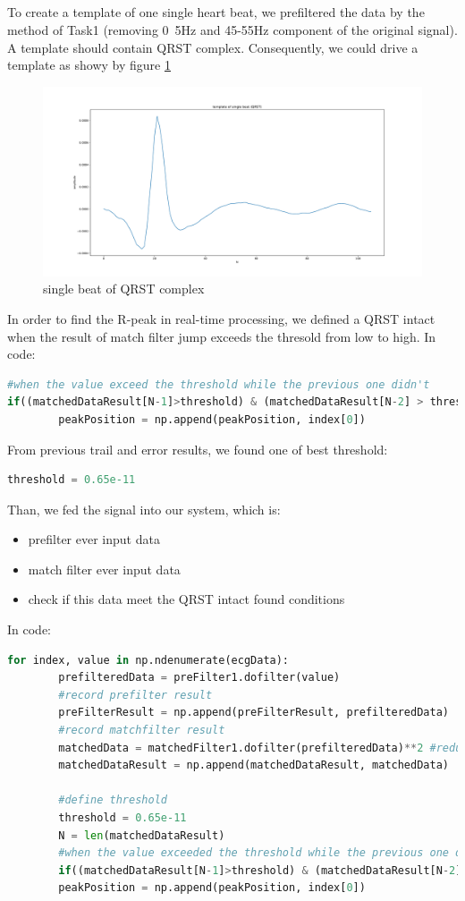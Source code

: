 \documentclass[a4paper,12pt]{article}
\begin{document}
\subsection{}
To create a template of one single heart beat, we prefiltered the data by the method of Task1 (removing 0~5Hz and 45-55Hz component of the original signal). A template should contain QRST complex. Consequently, we could drive a template as showy by figure \ref{fig_matchCore}
\begin{figure}[H]   
	\centering 
	\includegraphics[width=12cm]{../Figures/matchCore.pdf} 
	\caption{single beat of QRST complex}   
	\label{fig_matchCore}
\end{figure}
In order to find the R-peak in real-time processing, we defined a QRST intact when the result of match filter jump exceeds the thresold from low to high.  In code:
\begin{lstlisting}[language=Python]
#when the value exceed the threshold while the previous one didn't
if((matchedDataResult[N-1]>threshold) & (matchedDataResult[N-2] > threshold)):
		peakPosition = np.append(peakPosition, index[0])
\end{lstlisting}
From previous trail and error results, we found one of best threshold:
\begin{lstlisting}[language=Python]
threshold = 0.65e-11
\end{lstlisting}
Than, we fed the signal into our system, which is:
\begin{itemize}
	\item prefilter ever input data
	\item match filter ever input data
	\item check if this data meet the QRST intact found conditions
\end{itemize}
In code:
\begin{lstlisting}[language=Python]
for index, value in np.ndenumerate(ecgData):
		prefilteredData = preFilter1.dofilter(value)
		#record prefilter result
		preFilterResult = np.append(preFilterResult, prefilteredData)
		#record matchfilter result
		matchedData = matchedFilter1.dofilter(prefilteredData)**2 #reduce S/N ratio
		matchedDataResult = np.append(matchedDataResult, matchedData)
		
		#define threshold
		threshold = 0.65e-11
		N = len(matchedDataResult)
		#when the value exceeded the threshold while the previous one didn't
		if((matchedDataResult[N-1]>threshold) & (matchedDataResult[N-2] > threshold)):
		peakPosition = np.append(peakPosition, index[0])
\end{lstlisting}
\end{document}
